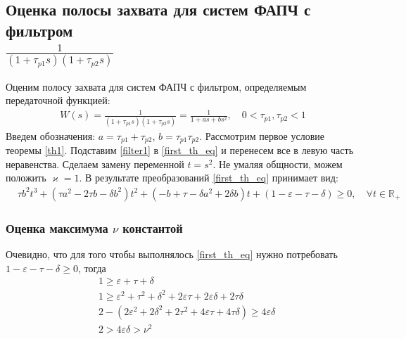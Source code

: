 \documentclass[a4paper,14pt]{article} %
\begin{document}
\subsection{Оценка полосы захвата для систем ФАПЧ с фильтром \\ $\frac{1}{(1+\tau_{p1}s)(1+\tau_{p2}s)}$}
Оценим полосу захвата для систем ФАПЧ с фильтром, определяемым передаточной функцией:
 \begin{equation}\label{filter1}
 \begin{aligned}
W(s) = \frac{1}{(1+\tau_{p1}s)(1+\tau_{p2}s)} = \frac{1}{1+as + bs^2}, \quad 0<\tau_{p1},\tau_{p2} < 1
 \end{aligned}
\end{equation}
Введем обозначения: $a = \tau_{p1}+\tau_{p2}$, $b = \tau_{p1}\tau_{p2}$. Рассмотрим первое условие теоремы \ref{th1}. Подставим \eqref{filter1} в \eqref{first_th_eq} и перенесем все в левую часть неравенства. Сделаем замену переменной $t = s^2$. Не умаляя общности, можем положить $\varkappa = 1$. В результате преобразований \eqref{first_th_eq} принимает вид:
\begin{equation}\label{first_condition}
 \begin{aligned}
&\tau b^2t^3 + (\tau a^2-2 \tau b - \delta b^2)t^2 + (- b+\tau-\delta a^2 + 2\delta b)t + (1-\varepsilon-\tau-\delta) \geqslant 0, \quad \forall t \in \mathbb{R_+}
 \end{aligned}
\end{equation}

\subsubsection{Оценка максимума $\nu$ константой}
Очевидно, что для того чтобы выполнялось \eqref{first_th_eq} нужно потребовать  $1 - \varepsilon - \tau - \delta \geqslant 0$, тогда
\begin{equation}\label{const_ineq}
 \begin{aligned}
&1 \geqslant \varepsilon+\tau+\delta \\
&1 \geqslant \varepsilon^2 + \tau^2 + \delta^2 + 2\varepsilon\tau + 2\varepsilon\delta + 2\tau\delta\\
&2 -(2\varepsilon^2 + 2\delta^2 + 2\tau^2 +4\varepsilon\tau + 4\tau\delta) \geqslant 4\varepsilon\delta\\
&2 > 4\varepsilon\delta > \nu^2
 \end{aligned}
\end{equation}
\end{document}
